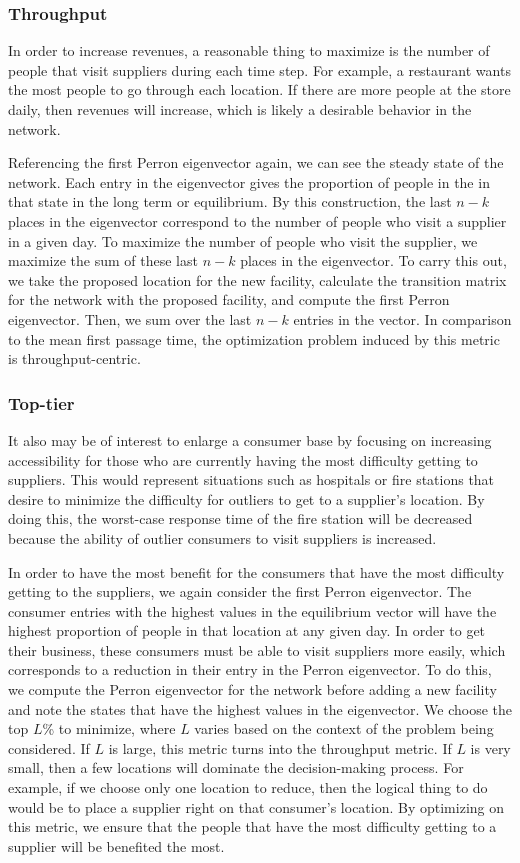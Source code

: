 \documentclass[twoside,twocolumn]{article}
\begin{document}
\subsubsection{Throughput}
In order to increase revenues, a reasonable thing to maximize is the number of people that visit suppliers during each time step.
For example, a restaurant wants the most people to go through each location.
If there are more people at the store daily, then revenues will increase, which is likely a desirable behavior in the network.

Referencing the first Perron eigenvector again, we can see the steady state of the network. 
Each entry in the eigenvector gives the proportion of people in the in that state in the long term or equilibrium. 
By this construction, the last $n - k$ places in the eigenvector correspond to the number of people who visit a supplier in a given day.
To maximize the number of people who visit the supplier, we maximize the sum of these last $n - k$ places in the eigenvector.
To carry this out, we take the proposed location for the new facility, calculate the transition matrix for the network with the proposed facility, and compute the first Perron eigenvector.
Then, we sum over the last $n - k$ entries in the vector.
In comparison to the mean first passage time, the optimization problem induced by this metric is throughput-centric.
\subsubsection{Top-tier}
It also may be of interest to enlarge a consumer base by focusing on increasing accessibility for those who are currently having the most difficulty getting to suppliers.
This would represent situations such as hospitals or fire stations that desire to minimize the difficulty for outliers to get to a supplier's location.
By doing this, the worst-case response time of the fire station will be decreased because the ability of outlier consumers to visit suppliers is increased.

In order to have the most benefit for the consumers that have the most difficulty getting to the suppliers, we again consider the first Perron eigenvector.
The consumer entries with the highest values in the equilibrium vector will have the highest proportion of people in that location at any given day.
In order to get their business, these consumers must be able to visit suppliers more easily, which corresponds to a reduction in their entry in the Perron eigenvector.
To do this, we compute the Perron eigenvector for the network before adding a new facility and note the states that have the highest values in the eigenvector.
We choose the top $L$\% to minimize, where $L$ varies based on the context of the problem being considered.
If $L$ is large, this metric turns into the throughput metric.
If $L$ is very small, then a few locations will dominate the decision-making process.
For example, if we choose only one location to reduce, then the logical thing to do would be to place a supplier right on that consumer's location.
By optimizing on this metric, we ensure that the people that have the most difficulty getting to a supplier will be benefited the most.
\end{document}

